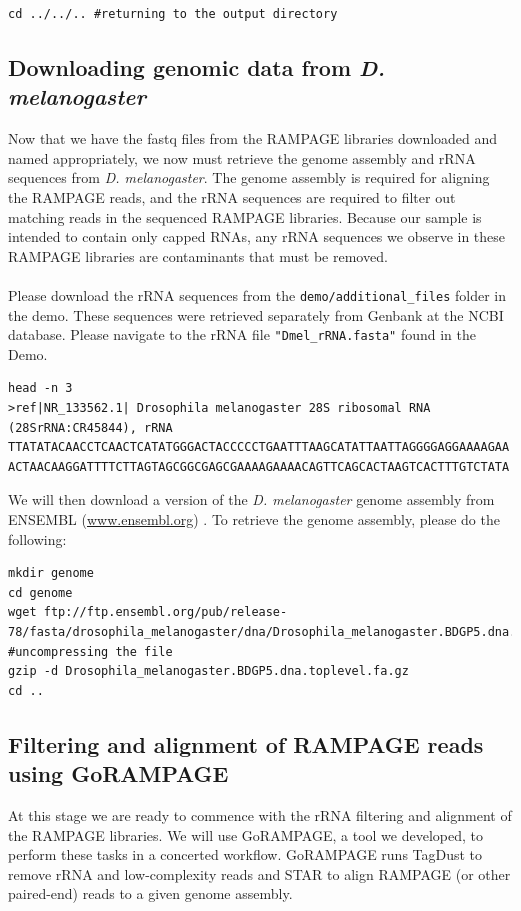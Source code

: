 \documentclass[runningheads,a4paper]{llncs}
\begin{document}
\begin{linenumbers}
\begin{verbatim}
cd ../../.. #returning to the output directory
\end{verbatim}

\subsection{Downloading genomic data from \textit{D. melanogaster}}
Now that we have the fastq files from the RAMPAGE libraries downloaded and named appropriately, we now must retrieve the genome assembly and rRNA sequences from \textit{D. melanogaster}.
The genome assembly is required for aligning the RAMPAGE reads, and the rRNA sequences are required to filter out matching reads in the sequenced RAMPAGE libraries.
Because our sample is intended to contain only capped RNAs, any rRNA sequences we observe in these RAMPAGE libraries are contaminants that must be removed.\\
\\
\noindent
Please download the rRNA sequences from the \texttt{demo/additional\_files} folder in the demo.
These sequences were retrieved separately from Genbank at the NCBI database.
Please navigate to the rRNA file \texttt{"Dmel\_rRNA.fasta"} found in the Demo.

\noindent
\begin{verbatim}
head -n 3
>ref|NR_133562.1| Drosophila melanogaster 28S ribosomal RNA (28SrRNA:CR45844), rRNA
TTATATACAACCTCAACTCATATGGGACTACCCCCTGAATTTAAGCATATTAATTAGGGGAGGAAAAGAA
ACTAACAAGGATTTTCTTAGTAGCGGCGAGCGAAAAGAAAACAGTTCAGCACTAAGTCACTTTGTCTATA
\end{verbatim}

We will then download a version of the \textit{D. melanogaster} genome assembly from ENSEMBL (\url{www.ensembl.org}) \cite{Yates:2016tbc}.
To retrieve the genome assembly, please do the following:

\noindent
\begin{verbatim}
mkdir genome
cd genome
wget ftp://ftp.ensembl.org/pub/release-78/fasta/drosophila_melanogaster/dna/Drosophila_melanogaster.BDGP5.dna.toplevel.fa.gz
#uncompressing the file
gzip -d Drosophila_melanogaster.BDGP5.dna.toplevel.fa.gz
cd ..
\end{verbatim}

\subsection{Filtering and alignment of RAMPAGE reads using GoRAMPAGE}
At this stage we are ready to commence with the rRNA filtering and alignment of the RAMPAGE libraries.
We will use GoRAMPAGE, a tool we developed, to perform these tasks in a concerted workflow. 
GoRAMPAGE runs TagDust \cite{Lassmann:2015gs} to remove rRNA and low-complexity reads and STAR \cite{Dobin:2016kq} to align RAMPAGE (or other paired-end) reads to a given genome assembly.


\end{linenumbers}
\end{document}
